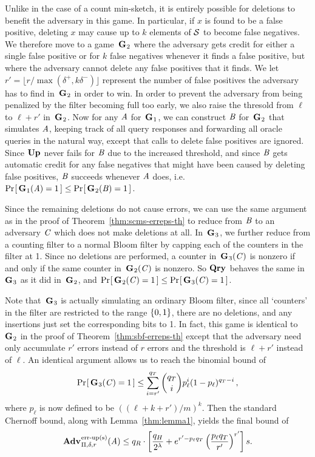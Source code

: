 Unlike in the case of a count min-sketch, it is entirely possible for deletions
to benefit the adversary in this game. In particular, if $x$ is found to be a
false positive, deleting $x$ may cause up to $k$ elements of $\mathcal{S}$ to become
false negatives. We therefore move to a game~$\textup{\textbf{G}}\hspace{0.5pt}_2$ where the adversary gets
credit for either a single false positive or for $k$ false negatives whenever it
finds a false positive, but where the adversary cannot delete any false
positives that it finds. We let $r' = \lfloor r/\max(\delta^+,k\delta^-)\rfloor$
represent the number of false positives the adversary has to find in~$\textup{\textbf{G}}\hspace{0.5pt}_2$
in order to win. In order to prevent the adversary from being penalized by the
filter becoming full too early, we also raise the thresold from $\ell$ to
$\ell+r'$ in~$\textup{\textbf{G}}\hspace{0.5pt}_2$. Now for any $\mathit{A}$ for~$\textup{\textbf{G}}\hspace{0.5pt}_1$, we can construct
$\mathit{B}$ for~$\textup{\textbf{G}}\hspace{0.5pt}_2$ that simulates $\mathit{A}$, keeping track of all query
responses and forwarding all oracle queries in the natural way, except that
calls to delete false positives are ignored. Since $\textup{\textbf{Up}}\hspace{0.5pt}$ never fails for
$\mathit{B}$ due to the increased threshold, and since $\mathit{B}$ gets automatic credit
for any false negatives that might have been caused by deleting false positives,
$\mathit{B}$ succeeds whenever $\mathit{A}$ does, i.e.
$\Pr\hspace{-1pt}\left[\,\textup{\textbf{G}}\hspace{0.5pt}_1(\mathit{A})=1\,\right] \le \Pr\hspace{-1pt}\left[\,\textup{\textbf{G}}\hspace{0.5pt}_2(\mathit{B}) = 1\,\right]$.

Since the remaining deletions do not cause errors, we can use the same argument
as in the proof of Theorem~\ref{thm:scms-erreps-th} to reduce from $\mathit{B}$ to an
adversary $\mathit{C}$ which does not make deletions at all. In~$\textup{\textbf{G}}\hspace{0.5pt}_3$, we further
reduce from a counting filter to a normal Bloom filter by capping each of the
counters in the filter at 1. Since no deletions are performed, a counter
in~$\textup{\textbf{G}}\hspace{0.5pt}_3(\mathit{C})$ is nonzero if and only if the same counter
in~$\textup{\textbf{G}}\hspace{0.5pt}_2(\mathit{C})$ is nonzero. So $\textup{\textbf{Qry}}\hspace{0.5pt}$ behaves the same in~$\textup{\textbf{G}}\hspace{0.5pt}_3$ as it
did in~$\textup{\textbf{G}}\hspace{0.5pt}_2$, and $\Pr\hspace{-1pt}\left[\,\textup{\textbf{G}}\hspace{0.5pt}_2(\mathit{C})=1\,\right] \le \Pr\hspace{-1pt}\left[\,\textup{\textbf{G}}\hspace{0.5pt}_3(\mathit{C}) = 1\,\right]$.

Note that~$\textup{\textbf{G}}\hspace{0.5pt}_3$ is actually simulating an ordinary Bloom filter, since all
`counters' in the filter are restricted to the range $\{0,1\}$, there are no
deletions, and any insertions just set the corresponding bits to 1. In fact,
this game is identical to~$\textup{\textbf{G}}\hspace{0.5pt}_2$ in the proof of
Theorem~\ref{thm:sbf-erreps-th} except that the adversary need only accumulate
$r'$ errors instead of $r$ errors and the threshold is $\ell+r'$ instead of
$\ell$. An identical argument allows us to reach the binomial bound of
\begin{equation}
   \Pr\hspace{-1pt}\left[\,\textup{\textbf{G}}\hspace{0.5pt}_3(\mathit{C})=1\,\right] \le
     \sum_{i=r'}^{q_T} \binom{q_T}{i}p_\ell^i(1-p_\ell)^{q_T-i} \,,
\end{equation}
where $p_\ell$ is now defined to be $((\ell+k+r')/m)^k$. Then the standard
Chernoff bound, along with Lemma~\ref{thm:lemma1}, yields the final bound of
\begin{equation}
   \Adv{\erreps}_{\Pi,\delta,r}(\advA) \leq
     q_R \cdot \left[\frac{q_H}{2^\lambda} + e^{r'-p_\ell q_T}\left(\frac{p_\ell q_T}{r'}\right)^{r'}\right]s.
\end{equation}